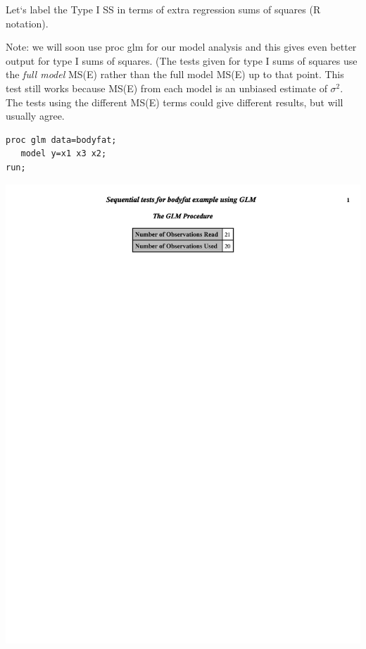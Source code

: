 Let`s label the Type I SS in terms of extra regression sums of squares (R notation).

\newpage

Note: we will soon use proc glm for our model analysis and this gives even better output for type I sums of squares.  (The tests given for type I sums of squares use the \textit{full model} MS(E) rather than the full model MS(E) up to that point.  This test still works because MS(E) from each model is an unbiased estimate of $\sigma^2$.  The tests using the different MS(E) terms could give different results, but will usually agree.\\

\begin{small}
\begin{verbatim}
proc glm data=bodyfat;
   model y=x1 x3 x2;   
run;
\end{verbatim}
\end{small}

\begin{center}
\includegraphics[page=2,scale=0.7,trim= 10mm 80mm 10mm 0mm]{bodyfatexampletypeIglm}
\end{center}

